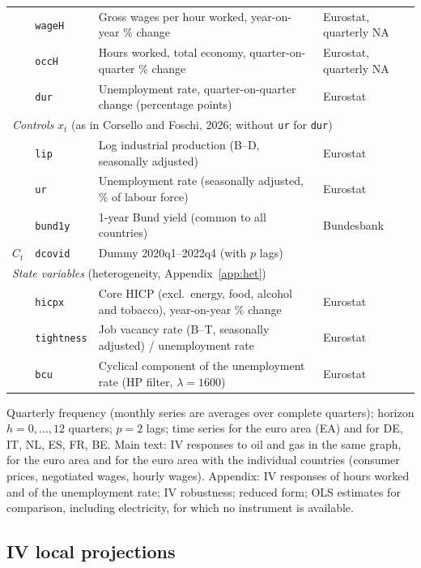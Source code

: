 \documentclass[11pt,a4paper]{article}
\begin{document}
\begin{table}[H]
\begin{tabular}{llp{6.2cm}l}
 & \texttt{wageH} & Gross wages per hour worked, year-on-year \% change & Eurostat, quarterly NA \\
 & \texttt{occH} & Hours worked, total economy, quarter-on-quarter \% change & Eurostat, quarterly NA \\
 & \texttt{dur} & Unemployment rate, quarter-on-quarter change (percentage points) & Eurostat \\
\midrule
\multicolumn{4}{l}{\emph{Controls} $x_{t}$ (as in Corsello and Foschi, 2026; without \texttt{ur} for \texttt{dur})} \\
 & \texttt{lip} & Log industrial production (B--D, seasonally adjusted) & Eurostat \\
 & \texttt{ur} & Unemployment rate (seasonally adjusted, \% of labour force) & Eurostat \\
 & \texttt{bund1y} & 1-year Bund yield (common to all countries) & Bundesbank \\
$C_t$ & \texttt{dcovid} & Dummy 2020q1--2022q4 (with $p$ lags) & \\
\midrule
\multicolumn{4}{l}{\emph{State variables} (heterogeneity, Appendix~\ref{app:het})} \\
 & \texttt{hicpx} & Core HICP (excl.\ energy, food, alcohol and tobacco), year-on-year \% change & Eurostat \\
 & \texttt{tightness} & Job vacancy rate (B--T, seasonally adjusted) / unemployment rate & Eurostat \\
 & \texttt{bcu} & Cyclical component of the unemployment rate (HP filter, $\lambda=1600$) & Eurostat \\
\bottomrule
\end{tabular}
\end{table}

\noindent Quarterly frequency (monthly series are averages over complete quarters);
horizon $h = 0,\dots,12$ quarters; $p = 2$ lags; time series for the euro area (EA)
and for DE, IT, NL, ES, FR, BE. Main text: IV responses to oil and gas in the same
graph, for the euro area and for the euro area with the individual countries
(consumer prices, negotiated wages, hourly wages). Appendix: IV responses of hours
worked and of the unemployment rate; IV robustness; reduced form; OLS estimates for comparison,
including electricity, for which no instrument is available.

\subsection{IV local projections}
\end{document}
